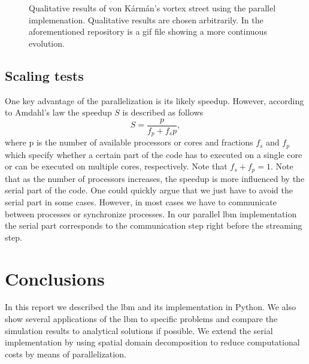\documentclass[a4paper,11pt, footsepline]{book}
\begin{document}
\begin{figure}
\begin{center}
            
   \caption{Qualitative results of von K\'{a}rm\'{a}n's vortex street using the parallel implemenation. Qualitative results are chosen arbitrarily. In the aforementioned repository is a gif file showing a more continuous evolution.}
  \label{fig:vonKarmanQualitative}
  \end{center}
\end{figure}

\section{Scaling tests}\label{sec-scaling}
One key advantage of the parallelization is its likely speedup. However, according to Amdahl's law \cite{Amdahl.1967} the speedup $S$ is described as follows
\begin{equation}
S=\frac{p}{f_{p}+f_{s}p},
\end{equation}
where p is the number of available processors or cores and fractions $f_{s}$ and $f_{p}$ which specify whether a certain part of the code has to executed on a single core or can be executed on multiple cores, respectively. Note that $f_{s}+f_{p}=1$. Note that as the number of processors increases, the speedup is more influenced by the serial part of the code. One could quickly argue that we just have to avoid the serial part in some cases. However, in most cases we have to communicate between processes or synchronize processes. In our parallel \ac{lbm} implementation the serial part corresponds to the communication step right before the streaming step.
\chapter{Conclusions}\label{ch-conclusion}
In this report we described the \ac{lbm} and its implementation in Python. We also show several applications of the \ac{lbm} to specific problems and compare the simulation results to analytical solutions if possible. We extend the serial implementation by using spatial domain decomposition to reduce computational costs by means of parallelization.
\end{document}
